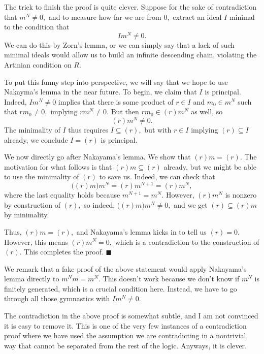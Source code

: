 The trick to finish the proof is quite clever. Suppose for the sake of contradiction that $m^N\ne0,$ and to measure how far we are from $0,$ extract an ideal $I$ minimal to the condition that
\[Im^N\ne0.\]
We can do this by Zorn's lemma, or we can simply say that a lack of such minimal ideals would allow us to build an infinite descending chain, violating the Artinian condition on $R.$

To put this funny step into perspective, we will say that we hope to use Nakayma's lemma in the near future. To begin, we claim that $I$ is principal. Indeed, $Im^N\ne0$ implies that there is some product of $r\in I$ and $m_0\in m^N$ such that $rm_0\ne0,$ implying $rm^N\ne0.$ But then $rm_0\in(r)m^N$ as well, so
\[(r)m^N\ne0.\]
The minimality of $I$ thus requires $I\subseteq(r),$ but with $r\in I$ implying $(r)\subseteq I$ already, we conclude $I=(r)$ is principal.

We now directly go after Nakayama's lemma. We show that $(r)m=(r).$ The motivation for what follows is that $(r)m\subseteq(r)$ already, but we might be able to use the minimality of $(r)$ to save us. Indeed, we can check that
\[\big((r)m\big)m^N=(r)m^{N+1}=(r)m^N,\]
where the last equality holds because $m^{N+1}=m^N.$ However, $(r)m^N$ is nonzero by construction of $(r),$ so indeed, $\big((r)m\big)m^N\ne0,$ and we get $(r)\subseteq (r)m$ by minimality.

Thus, $(r)m=(r),$ and Nakayama's lemma kicks in to tell us $(r)=0.$ However, this means $(r)m^N=0,$ which is a contradiction to the construction of $(r).$ This completes the proof. $\blacksquare$

We remark that a fake proof of the above statement would apply Nakayama's lemma directly to $m^Nm=m^N.$ This doesn't work because we don't know if $m^N$ is finitely generated, which is a crucial condition here. Instead, we have to go through all those gymnastics with $Im^N\ne0.$

The contradiction in the above proof is somewhat subtle, and I am not convinced it is easy to remove it. This is one of the very few instances of a contradiction proof where we have used the assumption we are contradicting in a nontrivial way that cannot be separated from the rest of the logic. Anyways, it is clever.

